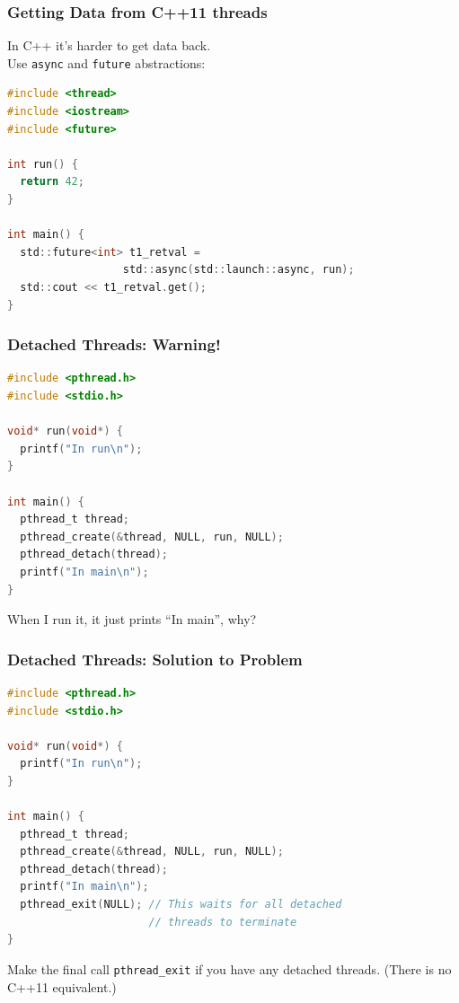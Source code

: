 \begin{frame}[fragile]
  \frametitle{Getting Data from C++11 threads}

    In C++ it's harder to get data back.\\
    Use {\tt async} and {\tt future} abstractions:
    \begin{lstlisting}[language=C]
#include <thread>
#include <iostream>
#include <future>

int run() {
  return 42;
}

int main() {
  std::future<int> t1_retval =
                  std::async(std::launch::async, run);
  std::cout << t1_retval.get();
}
\end{lstlisting}

  
\end{frame}


\begin{frame}[fragile]
  \frametitle{Detached Threads: Warning!}


\begin{lstlisting}[language=C]
#include <pthread.h>
#include <stdio.h>

void* run(void*) {
  printf("In run\n");
}

int main() {
  pthread_t thread;
  pthread_create(&thread, NULL, run, NULL);
  pthread_detach(thread);
  printf("In main\n");
}
\end{lstlisting}

  When I run it, it just prints ``In main'', why?


\end{frame}

\begin{frame}[fragile]
  \frametitle{Detached Threads: Solution to Problem}

  \begin{lstlisting}[language=C]
#include <pthread.h>
#include <stdio.h>

void* run(void*) {
  printf("In run\n");
}

int main() {
  pthread_t thread;
  pthread_create(&thread, NULL, run, NULL);
  pthread_detach(thread);
  printf("In main\n");
  pthread_exit(NULL); // This waits for all detached
                      // threads to terminate
}
  \end{lstlisting}

  Make the final call {\tt pthread\_exit} if you have any detached threads. (There is no C++11 equivalent.)

\end{frame}




